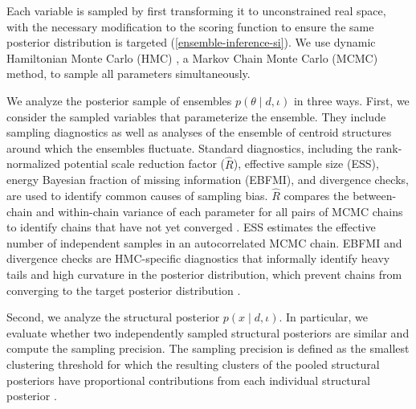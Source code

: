 \documentclass[../../main.tex]{subfiles}
\begin{document}
\begin{refsection}

	Each variable is sampled by first transforming it to unconstrained real space, with the necessary modification to the scoring function to ensure the same posterior distribution is targeted (\cref{ensemble-inference-si}).
	We use dynamic Hamiltonian Monte Carlo (HMC) \supercite{betancourtGeometricFoundationsHamiltonian2014,betancourtConceptualIntroductionHamiltonian2018}, a Markov Chain Monte Carlo (MCMC) method, to sample all parameters simultaneously.

	We analyze the posterior sample of ensembles $p(\theta \mid d,\iota)$ in three ways.
	First, we consider the sampled variables that parameterize the ensemble.
	They include sampling diagnostics as well as analyses of the ensemble of centroid structures around which the ensembles fluctuate.
	Standard diagnostics, including the rank-normalized potential scale reduction factor ($\hat{R}$), effective sample size (ESS), energy Bayesian fraction of missing information (EBFMI), and divergence checks, are used to identify common causes of sampling bias.
	$\hat{R}$ compares the between-chain and within-chain variance of each parameter for all pairs of MCMC chains to identify chains that have not yet converged \supercite{vehtariRanknormalizationFoldingLocalization2020}.
	ESS estimates the effective number of independent samples in an autocorrelated MCMC chain.
	EBFMI and divergence checks are HMC-specific diagnostics that informally identify heavy tails and high curvature in the posterior distribution, which prevent chains from converging to the target posterior distribution \supercite{betancourtDiagnosingSuboptimalCotangent2016,betancourtHamiltonianMonteCarlo2013}.

	Second, we analyze the structural posterior $p(x \mid d,\iota)$.
	In particular, we evaluate whether two independently sampled structural posteriors are similar and compute the sampling precision.
	The sampling precision is defined as the smallest clustering threshold for which the resulting clusters of the pooled structural posteriors have proportional contributions from each individual structural posterior \supercite{viswanathAssessingExhaustivenessStochastic2017}.


\end{refsection}
\end{document}
